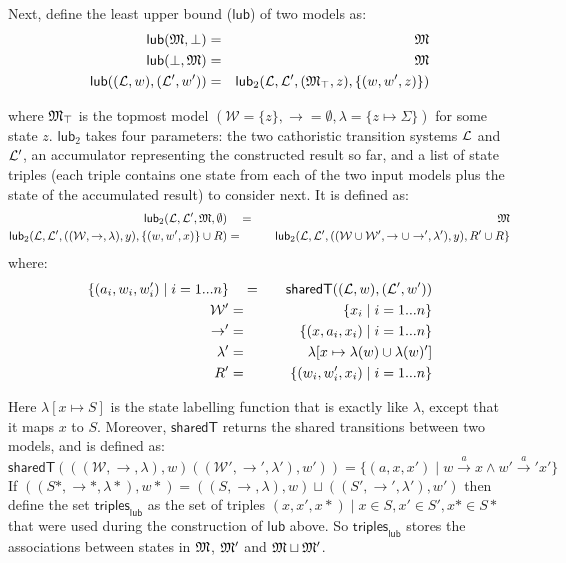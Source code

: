 \NI Next, define the least upper bound ($\mathsf{lub}$) of two models as:
\begin{eqnarray*}
\mathsf{lub}(\frak{M}, \bot) & = & \frak{M} \\
\mathsf{lub}(\bot, \frak{M}) & = & \frak{M} \\
\mathsf{lub}((\mathcal{L},w), (\mathcal{L}',w')) & = & \mathsf{lub}_2(\mathcal{L}, \mathcal{L}', (\frak{M}_\top, z), \{(w, w', z)\})
\end{eqnarray*}

\NI where $\frak{M}_\top$ is the topmost model $(\mathcal{W}=\{z\},
\rightarrow=\emptyset, \lambda=\{z \mapsto \Sigma\})$ for some state $z$.
$\mathsf{lub}_2$ takes four parameters: the two cathoristic transition
systems $\mathcal{L}$ and $\mathcal{L}'$, an accumulator representing the
constructed result so far, and a list of state triples (each triple
contains one state from each of the two input models plus the state of
the accumulated result) to consider next.  It is defined as:
\begin{eqnarray*}
  \mathsf{lub}_2(\mathcal{L}, \mathcal{L}', \frak{M}, \emptyset) 
     &\quad =\quad & 
  \frak{M} \\
  \mathsf{lub}_2(\mathcal{L}, \mathcal{L}', ((\mathcal{W}, \rightarrow, \lambda), y), \{(w,w',x)\} \cup R) 
     & = & 
  \mathsf{lub}_2(\mathcal{L}, \mathcal{L}', ((\mathcal{W} \cup \mathcal{W}', \rightarrow \cup \rightarrow', \lambda'), y), R' \cup R\}
\end{eqnarray*}
where:
\begin{eqnarray*}
  \{(a_i, w_i, w'_i) \;|\; i = 1 ... n\} 
     &\quad =\quad & 
  \mathsf{sharedT}((\mathcal{L},w), (\mathcal{L}',w')) \\
  \mathcal{W}' 
     & = & 
  \{x_i \;|\; i = 1 ... n\} \\
  \rightarrow' 
     & = & 
  \{(x, a_i, x_i) \;|\; i = 1 ... n\} \\
  \lambda' 
     & = & 
  \lambda [x \mapsto \lambda(w) \cup \lambda(w)'] \\
  R' 
     & = & 
  \{(w_i, w'_i, x_i) \;|\; i = 1 ... n\}
\end{eqnarray*}

\NI Here $\lambda[x \mapsto S]$ is the state labelling function that is
exactly like $\lambda$, except that it maps $x$ to $S$.  Moreover,
$\mathsf{sharedT}$ returns the shared transitions between two models,
and is defined as:
\[
\mathsf{sharedT}(((\mathcal{W}, \rightarrow, \lambda),w) ((\mathcal{W}', \rightarrow', \lambda'),w')) =  \{(a, x, x') \;|\; w \xrightarrow{a} x \land w' \xrightarrow{a}' x'\}
\]
If $((S*,\rightarrow*,\lambda*),w*) = ((S,\rightarrow,\lambda),w) \sqcup ((S',\rightarrow',\lambda'),w')$ then define
the set $\mathsf{triples}_\mathsf{lub}$ as the set of triples $(x,x',x*) \; | \; x \in S, x' \in S', x* \in S*$ that were used during the construction of $\mathsf{lub}$ above. So $\mathsf{triples}_\mathsf{lub}$ stores the associations between states in $\frak{M}$, $\frak{M}'$ and $\frak{M} \sqcup \frak{M}'$. 

